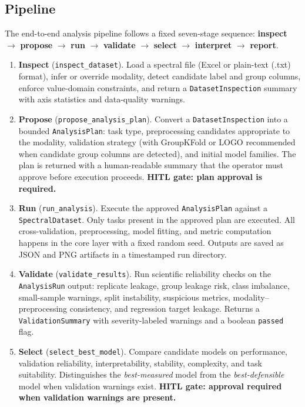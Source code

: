 \subsection{Pipeline}
\label{sec:pipeline}

The end-to-end analysis pipeline follows a fixed seven-stage sequence:
\textbf{inspect} $\to$ \textbf{propose} $\to$ \textbf{run} $\to$
\textbf{validate} $\to$ \textbf{select} $\to$ \textbf{interpret} $\to$
\textbf{report}.

\begin{enumerate}
  \item \textbf{Inspect} (\texttt{inspect\_dataset}).
    Load a spectral file (Excel or plain-text (.txt) format), infer or override modality,
    detect candidate label and group columns, enforce value-domain constraints,
    and return a \texttt{DatasetInspection} summary with axis statistics and
    data-quality warnings.

  \item \textbf{Propose} (\texttt{propose\_analysis\_plan}).
    Convert a \texttt{DatasetInspection} into a bounded \texttt{AnalysisPlan}:
    task type, preprocessing candidates appropriate to the modality,
    validation strategy (with GroupKFold or LOGO recommended when candidate
    group columns are detected), and initial model families.
    The plan is returned with a human-readable summary that the operator
    must approve before execution proceeds.
    \textbf{HITL gate: plan approval is required.}

  \item \textbf{Run} (\texttt{run\_analysis}).
    Execute the approved \texttt{AnalysisPlan} against a \texttt{SpectralDataset}.
    Only tasks present in the approved plan are executed.
    All cross-validation, preprocessing, model fitting, and metric computation
    happens in the core layer with a fixed random seed.
    Outputs are saved as JSON and PNG artifacts in a timestamped run directory.

  \item \textbf{Validate} (\texttt{validate\_results}).
    Run scientific reliability checks on the \texttt{AnalysisRun} output:
    replicate leakage, group leakage risk, class imbalance, small-sample
    warnings, split instability, suspicious metrics, modality--preprocessing
    consistency, and regression target leakage.
    Returns a \texttt{ValidationSummary} with severity-labeled warnings and
    a boolean \texttt{passed} flag.

  \item \textbf{Select} (\texttt{select\_best\_model}).
    Compare candidate models on performance, validation reliability,
    interpretability, stability, complexity, and task suitability.
    Distinguishes the \emph{best-measured} model from the
    \emph{best-defensible} model when validation warnings exist.
    \textbf{HITL gate: approval required when validation warnings are present.}


\end{enumerate}
